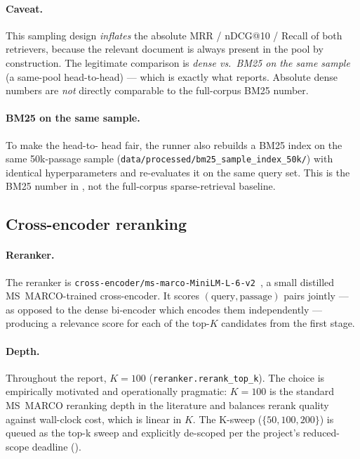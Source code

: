 \documentclass[11pt,a4paper]{article}
\makeatletter
\newcommand{\msmarco}{MS~MARCO}
\newcommand{\ndcg}{nDCG@10}
\newcommand{\bmtwofive}{BM25}
\makeatother
\begin{document}
\paragraph{Caveat.}  This sampling design \emph{inflates} the
absolute MRR / \ndcg{} / Recall of both retrievers, because the
relevant document is always present in the pool by construction.
The legitimate comparison is \emph{dense vs.\ \bmtwofive{} on the
same sample} (a same-pool head-to-head) --- which is exactly what
 reports.  Absolute dense numbers are \emph{not}
directly comparable to the full-corpus \bmtwofive{} number.

\paragraph{\bmtwofive{} on the same sample.}  To make the head-to-
head fair, the runner also rebuilds a \bmtwofive{} index on the same
50k-passage sample (\texttt{data/processed/bm25\_sample\_index\_50k/})
with identical hyperparameters and re-evaluates it on the same query
set.  This is the \bmtwofive{} number in , not
the full-corpus sparse-retrieval baseline.

\subsection{Cross-encoder reranking}
\label{sec:w5}

\paragraph{Reranker.}  The reranker is
\texttt{cross-encoder/ms-marco-MiniLM-L-6-v2}~\cite{nogueira2019passage,wang2020minilm},
a small distilled \msmarco{}-trained cross-encoder.  It scores
$(\text{query}, \text{passage})$ pairs jointly --- as opposed to the
dense bi-encoder which encodes them independently --- producing a
relevance score for each of the top-$K$ candidates from the first
stage.

\paragraph{Depth.}  Throughout the report, $K\!=\!100$
(\texttt{reranker.rerank\_top\_k}).  The choice is empirically
motivated and operationally pragmatic: $K\!=\!100$ is the standard
\msmarco{} reranking depth in the literature and balances rerank
quality against wall-clock cost, which is linear in $K$.  The
K-sweep ($\{50, 100, 200\}$) is queued as the top-k sweep and explicitly
de-scoped per the project's reduced-scope deadline
().
\end{document}
